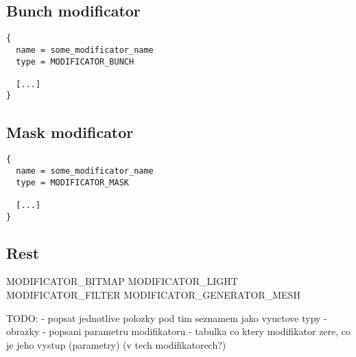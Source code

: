 \documentclass[11pt]{article}
\begin{document}
\subsection{Bunch modificator}

\begin{verbatim}
{
  name = some_modificator_name
  type = MODIFICATOR_BUNCH

  [...]
}
\end{verbatim}

\subsection{Mask modificator}

\begin{verbatim}
{
  name = some_modificator_name
  type = MODIFICATOR_MASK

  [...]
}
\end{verbatim}

\subsection{Rest}
MODIFICATOR\_BITMAP
MODIFICATOR\_LIGHT
MODIFICATOR\_FILTER
MODIFICATOR\_GENERATOR\_MESH

TODO:
- popsat jednotlive polozky pod tim seznamem jako
vyuctove typy
- obrazky
- popsani parametru modifikatoru
- tabulka co ktery modifikator zere, co je jeho vystup (parametry)
(v tech modifikatorech?)
\end{document}
